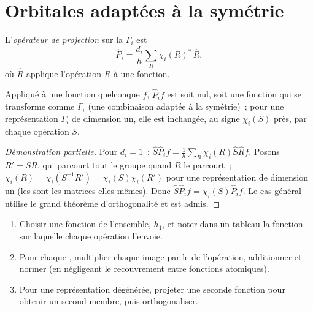 \section{Orbitales adaptées à la symétrie}

\begin{definition}\label{def:b3:group-theory-applied:projection}
L'\emph{opérateur de projection} sur la
 $\Gamma_i$ est
\[
\hat P_i = \frac{d_i}{h}\sum_R\chi_i(R)^*\,\hat R,
\]
où $\hat R$ applique l'opération $R$ à une fonction.
\end{definition}

\begin{proposition}\label{prop:b3:group-theory-applied:projection}
Appliqué à une fonction quelconque $f$, $\hat P_if$ est soit nul, soit une
fonction qui se transforme comme $\Gamma_i$ (une combinaison adaptée à
la symétrie)~; pour une représentation $\Gamma_i$ de dimension un, elle
est inchangée, au signe $\chi_i(S)$ près, par chaque
opération $S$.
\end{proposition}

\begin{proof}[Démonstration partielle]
Pour $d_i = 1$~: $\hat S\hat P_if = \frac1h\sum_R\chi_i(R)\hat S\hat Rf$.
Posons $R' = SR$,
qui parcourt tout le groupe quand $R$ le parcourt~; $\chi_i(R) = \chi_i(S^{-1}R') =
\chi_i(S)\chi_i(R')$ pour une représentation de dimension un (les
 sont les matrices elles-mêmes). Donc $\hat S\hat P_if = \chi_i(S)\hat P_if$.
Le cas général utilise le grand théorème d'orthogonalité et est admis.
\end{proof}

\begin{method}\label{met:b3:group-theory-applied:salc}
\begin{enumerate}
  \item Choisir une fonction de l'ensemble, $h_1$, et noter dans un
        tableau la fonction sur laquelle chaque opération l'envoie.
  \item Pour chaque , multiplier chaque image
        par le  de l'opération, additionner et normer (en
        négligeant le recouvrement entre fonctions atomiques).
  \item Pour une représentation dégénérée, projeter une seconde fonction
        pour obtenir un second membre, puis orthogonaliser.
\end{enumerate}
\end{method}


